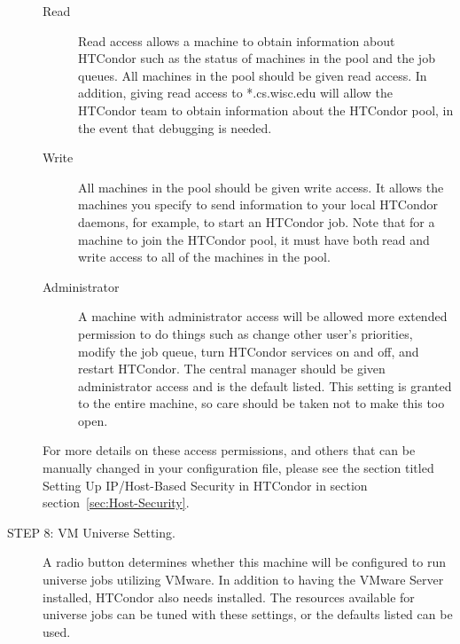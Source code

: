 \begin{description}
     \begin{description}
     \item[Read]
     Read access allows a machine to obtain information about
     HTCondor such as the status of machines in the pool and the job queues.
     All machines in the pool should be given read access. 
     In addition, giving read access to *.cs.wisc.edu 
     will allow the HTCondor team to obtain information about
     the HTCondor pool, in the event that debugging is needed.
     \item[Write]
     All machines in the pool should be given write access. 
     It allows the machines you specify to send information to your
     local HTCondor daemons, for example, to start an HTCondor job.
     Note that for a machine to join the HTCondor pool, 
     it must have both read and write access to all of the machines in the pool.
     \item[Administrator]
     A machine with administrator access will be allowed more
     extended permission to do things such as
     change other user's priorities, modify the job queue,
     turn HTCondor services on and off, and restart HTCondor.
     The central manager should be given administrator access
     and is the default listed.
     This setting is granted to the entire machine, 
     so care should be taken not to make this too open.
     \end{description}

     For more details on these access permissions, and others that can be
     manually changed in your configuration file, please
     see the section titled Setting Up IP/Host-Based Security in HTCondor
     in section section~\ref{sec:Host-Security}.

\item[STEP 8: VM Universe Setting.]
     A radio button determines whether 
     this machine will be configured to run  universe jobs 
     utilizing VMware.
     In addition to having the VMware Server installed, HTCondor also needs
      installed.
     The resources available for  universe jobs can be tuned 
     with these settings, or the defaults listed can be used.


\end{description}
